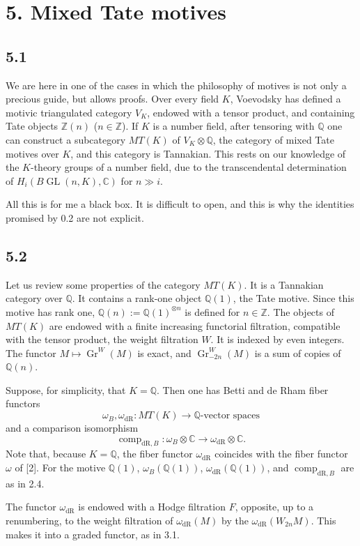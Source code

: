 \documentclass[11pt]{article}
\newcommand{\Q}{\mathbb Q}
\newcommand{\Z}{\mathbb Z}
\newcommand{\C}{\mathbb C}
\newcommand{\GL}{\operatorname{GL}}
\newcommand{\Gr}{\operatorname{Gr}}
\newcommand{\comp}{\operatorname{comp}}
\newcommand{\dR}{\mathrm{dR}}
\begin{document}
\section*{5. Mixed Tate motives}

\subsection*{5.1}
We are here in one of the cases in which the philosophy of motives is not only a precious guide, but allows proofs.
Over every field $K$, Voevodsky has defined a motivic triangulated category $V_K$, endowed with a tensor product, and containing Tate objects $\Z(n)$ ($n\in\Z$).
If $K$ is a number field, after tensoring with $\Q$ one can construct a subcategory $MT(K)$ of $V_K\otimes\Q$, the category of mixed Tate motives over $K$, and this category is Tannakian.
This rests on our knowledge of the $K$-theory groups of a number field, due to the transcendental determination of $H_i(B\GL(n,K),\C)$ for $n\gg i$.

All this is for me a black box.
It is difficult to open, and this is why the identities promised by 0.2 are not explicit.

\subsection*{5.2}
Let us review some properties of the category $MT(K)$.
It is a Tannakian category over $\Q$.
It contains a rank-one object $\Q(1)$, the Tate motive.
Since this motive has rank one, $\Q(n):=\Q(1)^{\otimes n}$ is defined for $n\in\Z$.
The objects of $MT(K)$ are endowed with a finite increasing functorial filtration, compatible with the tensor product, the weight filtration $W$.
It is indexed by even integers.
The functor $M\mapsto\Gr^W(M)$ is exact, and $\Gr^W_{-2n}(M)$ is a sum of copies of $\Q(n)$.

Suppose, for simplicity, that $K=\Q$.
Then one has Betti and de Rham fiber functors
\[
 \omega_B,\omega_{\dR}:MT(K)\longrightarrow \Q\text{-vector spaces}
\]
and a comparison isomorphism
\[
 \comp_{\dR,B}:\omega_B\otimes\C\longrightarrow \omega_{\dR}\otimes\C.
\]
Note that, because $K=\Q$, the fiber functor $\omega_{\dR}$ coincides with the fiber functor $\omega$ of [2].
For the motive $\Q(1)$, $\omega_B(\Q(1))$, $\omega_{\dR}(\Q(1))$, and $\comp_{\dR,B}$ are as in 2.4.

The functor $\omega_{\dR}$ is endowed with a Hodge filtration $F$, opposite, up to a renumbering, to the weight filtration of $\omega_{\dR}(M)$ by the $\omega_{\dR}(W_{2n}M)$.
This makes it into a graded functor, as in 3.1.
\end{document}
